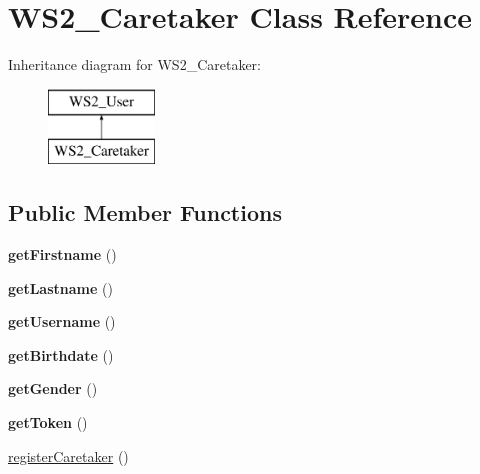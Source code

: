 \hypertarget{class_w_s2___caretaker}{\section{W\+S2\+\_\+\+Caretaker Class Reference}
\label{class_w_s2___caretaker}
}
Inheritance diagram for W\+S2\+\_\+\+Caretaker\+:\begin{figure}[H]
\begin{center}
\leavevmode
\includegraphics[height=2.000000cm]{class_w_s2___caretaker}
\end{center}
\end{figure}
\subsection*{Public Member Functions}
\begin{DoxyCompactItemize}
\item 
\hypertarget{class_w_s2___caretaker_a42c9621713b6dcdfb9edd5a7630b6d93}{{\bfseries get\+Firstname} ()}\label{class_w_s2___caretaker_a42c9621713b6dcdfb9edd5a7630b6d93}

\item 
\hypertarget{class_w_s2___caretaker_a5d606fdf02d35b79b74b91a88c09000f}{{\bfseries get\+Lastname} ()}\label{class_w_s2___caretaker_a5d606fdf02d35b79b74b91a88c09000f}

\item 
\hypertarget{class_w_s2___caretaker_a81b37a3c9d639574e394f80c1138c75e}{{\bfseries get\+Username} ()}\label{class_w_s2___caretaker_a81b37a3c9d639574e394f80c1138c75e}

\item 
\hypertarget{class_w_s2___caretaker_aeafdb95ad7b97a5ff68ac785e8c243e5}{{\bfseries get\+Birthdate} ()}\label{class_w_s2___caretaker_aeafdb95ad7b97a5ff68ac785e8c243e5}

\item 
\hypertarget{class_w_s2___caretaker_af7313369f22d5c761e16462abe0c6ae1}{{\bfseries get\+Gender} ()}\label{class_w_s2___caretaker_af7313369f22d5c761e16462abe0c6ae1}

\item 
\hypertarget{class_w_s2___caretaker_a211a2979c22afcd7d9056a2bb55aa449}{{\bfseries get\+Token} ()}\label{class_w_s2___caretaker_a211a2979c22afcd7d9056a2bb55aa449}

\item 
\hyperlink{class_w_s2___caretaker_a471f3c30d6c985670b14543252f47ab0}{register\+Caretaker} ()
\end{DoxyCompactItemize}
